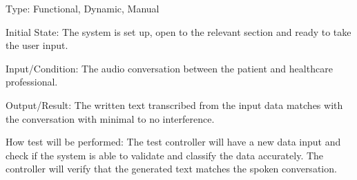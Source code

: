 \documentclass[12pt, titlepage]{article}
\begin{document}
\begin{enumerate}
    Type: Functional, Dynamic, Manual
    
    Initial State: The system is set up, open to the relevant section and ready to take the user input.
    
    Input/Condition: The audio conversation between the patient and healthcare professional.
    
    Output/Result: The written text transcribed from the input data matches with the conversation with minimal to no interference.

    How test will be performed: The test controller will have a new data input and check if the system is able to validate and classify the data accurately. The controller will verify that the generated text matches the spoken conversation.

\end{enumerate}

\newpage
\end{document}
